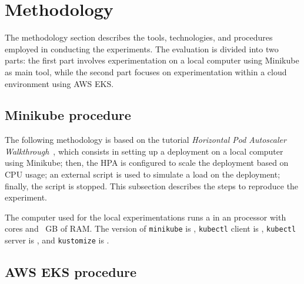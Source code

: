 \section{Methodology}

The methodology section describes the tools, technologies, and procedures employed in conducting the experiments.
The evaluation is divided into two parts: the first part involves experimentation on a local computer using Minikube as main tool, while the second part focuses on experimentation within a cloud environment using AWS EKS.

\subsection{Minikube procedure}
The following methodology is based on the tutorial \textit{Horizontal Pod Autoscaler Walkthrough}~\cite{KubernetesHpaWalkthrough}, which consists in setting up a deployment on a local computer using Minikube; then, the HPA is configured to scale the deployment based on CPU usage; an external script is used to simulate a load on the deployment; finally, the script is stopped.
This subsection describes the steps to reproduce the experiment.





The computer used for the local experimentations runs a \operatingSystem{} in an \cpuModel{} processor with \cpuCores{} cores and \cpuRam{}~GB of RAM.
The version of \texttt{minikube} is \minikubeVersion{}, \texttt{kubectl} client is \kubectlClientVersion{}, \texttt{kubectl} server is \kubectlServerVersion{}, and \texttt{kustomize} is \kubectlKustomizeVersion{}.

\subsection{AWS EKS procedure} %
